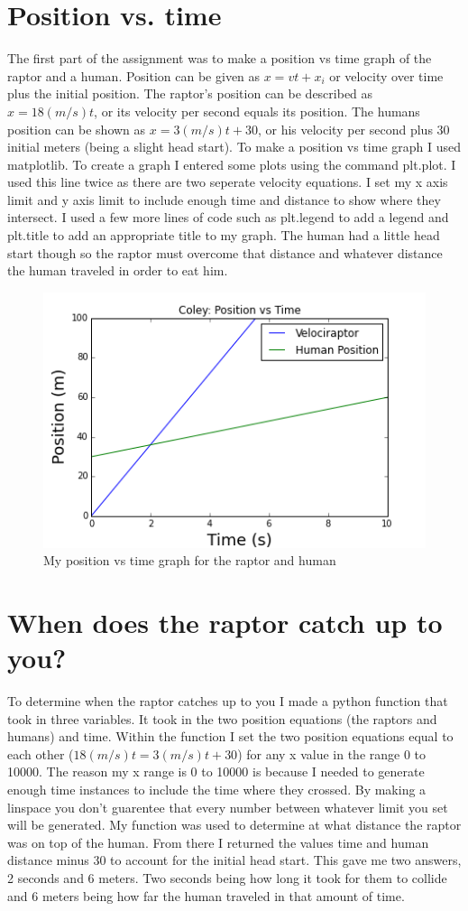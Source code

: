 \documentclass[twocolumn]{revtex4}
\begin{document}
\section{Position vs. time}
	The first part of the assignment was to make a position vs time graph of the raptor and a human. Position can be given as $x = vt + x_i $ or velocity over time plus the initial position. The raptor's position can be described as  $x = 18(m/s)t $, or its velocity per second equals its position. The humans position can be shown as $ x = 3(m/s)t + 30 $, or his velocity per second plus 30 initial meters (being a slight head start). To make a position vs time graph I used matplotlib. To create a graph I entered some plots using the command plt.plot. I used this line twice as there are two seperate velocity equations. I set my x axis limit and y axis limit to include enough time and distance to show where they intersect. I used a few more lines of code such as plt.legend to add a legend and plt.title to add an appropriate title to my graph. The human had a little head start though so the raptor must overcome that distance and whatever distance the human traveled in order to eat him.
	\begin{figure}[h]
	\centering
	\includegraphics[scale=.5]{Position_vs_Time.png}
	\caption{My position vs time graph for the raptor and human}
	\end{figure}
\section{When does the raptor catch up to you?}
	To determine when the raptor catches up to you I made a python function that took in three variables. It took in the two position equations (the raptors and humans) and time. Within the function I set the two position equations equal to each other ($ 18(m/s)t = 3(m/s)t + 30 $) for any x value in the range 0 to 10000. The reason my x range is 0 to 10000 is because I needed to generate enough time instances to include the time where they crossed. By making a linspace you don't guarentee that every number between whatever limit you set will be generated. My function was used to determine at what distance the raptor was on top of the human. From there I returned the values time and human distance minus 30 to account for the initial head start. This gave me two answers, 2 seconds and 6 meters. Two seconds being how long it took for them to collide and 6 meters being how far the human traveled in that amount of time. 
\end{document}
